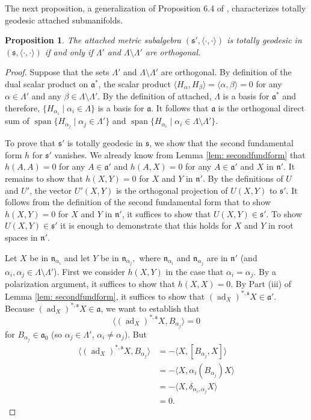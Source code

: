 \documentclass[12pt]{amsart}
\newcommand{\la}{\langle}
\newcommand{\ra}{\rangle}
\newcommand{\myspan}{\operatorname{span}}
\newcommand{\fraka}{\ensuremath{\mathfrak{a}} }
\newcommand{\frakn}{\ensuremath{\mathfrak{n}} }
\newcommand{\fraks}{\ensuremath{\mathfrak{s}} }
\newcommand\s{{\mathfrak{s}}}
\newcommand\ip{{\langle\cdot {,} \cdot\rangle}}
\newcommand\ad{\operatorname{ad}}
\theoremstyle{plain}
\newtheorem{prop}[theorem]{Proposition}
\theoremstyle{definition}
\theoremstyle{remark}
\numberwithin{equation}{section}
\numberwithin{theorem}{section}
\begin{document}
 The next proposition, a generalization of 
  Proposition 6.4 of \cite{tamaru-11},  characterizes  totally geodesic attached submanifolds. 
\begin{prop}\label{prop: tot-geodesic}  
The attached metric subalgebra  $(\fraks',\ip)$ is totally geodesic in  $(\fraks, \ip)$ 
if and only if
  $\Lambda'$ and $\Lambda \setminus \Lambda'$ are orthogonal.
\end{prop}
\begin{proof} Suppose that  the sets $\Lambda'$ and $\Lambda \setminus \Lambda'$ are orthogonal.
By definition of the dual scalar product on $\fraka^*$, the scalar  product 
 $\la H_\alpha, H_\beta \ra =\la \alpha,\beta \ra = 0$  for any $\alpha \in \Lambda'$ and any $\beta \in \Lambda \setminus \Lambda'$. 
 By the definition of attached, $\Lambda$ is a basis for $\fraka^\ast$ and therefore,  $\{H_{\alpha_i} \mid \alpha_i \in \Lambda\}$  is a basis for $\fraka$. It follows that $\fraka$ is the orthogonal direct sum of 
 $\myspan\{H_{\alpha_j} \mid \alpha_j \in \Lambda' \}$ and $\myspan \{ H_{\alpha_i} \mid \alpha_i \in  \Lambda \setminus \Lambda'\}.$

To prove that $\s'$ is totally geodesic in $\fraks$, we show that the second fundamental form $h$ for $\s'$ vanishes. We already know from Lemma \ref{lem: secondfundform} that 
$h(A,A)=0$ for any $A \in \fraka'$ and 
$h(A,X)=0$ for any $A \in \fraka'$ and $X$ in $\frakn'$.  It remains to show that $h(X, Y) = 0$ for $X$ and $Y$ in $\frakn'$. 
By the definitions of $U$ and $U'$, the  vector $U'(X,Y)$ is the orthogonal projection of $U(X,Y)$ to $\fraks'.$  It follows from the  definition of the second fundamental form  that  to show $h(X, Y) = 0$ for $X$ and $Y$ in $\frakn'$, it suffices to show that  $U(X,Y) \in \fraks'$. 
To show  $U(X,Y) \in \fraks'$ it is enough to demonstrate that this holds for 
$X$ and $Y$ in root spaces in $\frakn'.$  

Let $X$ be in $\frakn_{\alpha_i}$ and let $Y$ be in $\frakn_{\alpha_j},$  where  $\frakn_{\alpha_i}$ and $\frakn_{\alpha_j}$ are in $  \frakn'$ (and $\alpha_i, \alpha_j  \in \Lambda \setminus
\Lambda'$).  
First we consider $h(X,Y)$ in the case that $\alpha_i = \alpha_j.$  By a 
polarization argument, it suffices to show that  $h(X,X) =0 $.  
By Part (iii) of
Lemma  \ref{lem: secondfundform}, 
 it suffices to show that $(\ad_X)^{\ast,\fraks} X \in
\fraka'$. Because  $(\ad_X)^{\ast,\fraks} X \in \fraka$,
 we want to establish that
\[ \la (\ad_X)^{\ast,\fraks} X, B_{\alpha_j} \ra = 0 \]
for $B_{\alpha_j} \in \fraka_0$ (so $\alpha_j \in \Lambda'$,
$\alpha_i \ne \alpha_j$).  But 
\begin{align*} \la (\ad_X)^{\ast,\fraks} X, B_{\alpha_j} \ra &= 
- \la  X, [B_{\alpha_j},X] \ra  \\ 
&= - \la  X, \alpha_i(B_{\alpha_j})X \ra \\
&= - \la  X, \delta_{\alpha_i,\alpha_j} X \ra  \\ 
&= 0. \end{align*}


\end{proof}
\end{document}
